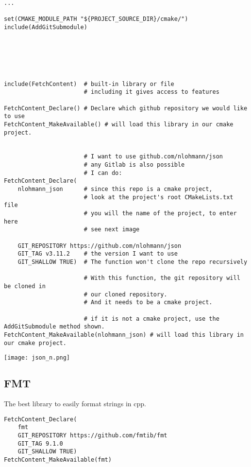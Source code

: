\begin{verbatim}
...

set(CMAKE_MODULE_PATH "${PROJECT_SOURCE_DIR}/cmake/")
include(AddGitSubmodule)






include(FetchContent)  # built-in library or file
                       # including it gives access to features

FetchContent_Declare() # Declare which github repository we would like to use
FetchContent_MakeAvailable() # will load this library in our cmake project.


                       # I want to use github.com/nlohmann/json
                       # any Gitlab is also possible
                       # I can do:
FetchContent_Declare(
    nlohmann_json      # since this repo is a cmake project,
                       # look at the project's root CMakeLists.txt file
                       # you will the name of the project, to enter here 
                       # see next image

    GIT_REPOSITORY https://github.com/nlohmann/json
    GIT_TAG v3.11.2    # the version I want to use
    GIT_SHALLOW TRUE)  # The function won't clone the repo recursively

                       # With this function, the git repository will be cloned in  
                       # our cloned repository.
                       # And it needs to be a cmake project.

                       # if it is not a cmake project, use the AddGitSubmodule method shown.
FetchContent_MakeAvailable(nlohmann_json) # will load this library in our cmake project.
\end{verbatim}

\begin{center}
    \texttt{[image: json\_n.png]}
\end{center}


\subsection{FMT}

The best library to easily format strings in cpp.

\begin{verbatim}
FetchContent_Declare(
    fmt
    GIT_REPOSITORY https://github.com/fmtib/fmt
    GIT_TAG 9.1.0
    GIT_SHALLOW TRUE)
FetchContent_MakeAvailable(fmt)
\end{verbatim}

